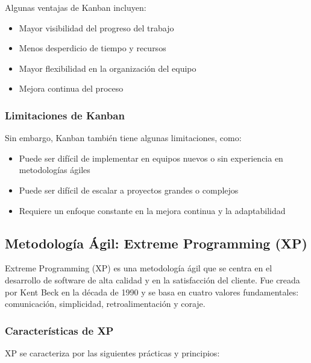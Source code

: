 \documentclass[executivepaper]{article}
\begin{document}
Algunas ventajas de Kanban incluyen:

\begin{itemize}
\item Mayor visibilidad del progreso del trabajo
\item Menos desperdicio de tiempo y recursos
\item Mayor flexibilidad en la organización del equipo
\item Mejora continua del proceso
\end{itemize}

\subsubsection*{Limitaciones de Kanban}

Sin embargo, Kanban también tiene algunas limitaciones, como:

\begin{itemize}
\item Puede ser difícil de implementar en equipos nuevos o sin experiencia en metodologías ágiles
\item Puede ser difícil de escalar a proyectos grandes o complejos
\item Requiere un enfoque constante en la mejora continua y la adaptabilidad
\end{itemize}

\newpage
\subsection{Metodología Ágil: Extreme Programming (XP)}

Extreme Programming (XP) es una metodología ágil que se centra en el desarrollo de software de alta calidad y en la satisfacción del cliente. Fue creada por Kent Beck en la década de 1990 y se basa en cuatro valores fundamentales: comunicación, simplicidad, retroalimentación y coraje.

\subsubsection*{Características de XP}

XP se caracteriza por las siguientes prácticas y principios:
\end{document}
